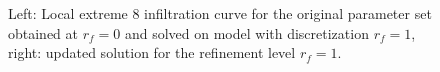 \documentclass[review,times,3p,10pt]{elsarticle}
\begin{document}
\begin{figure}
\label{rf0rf1img2}
\caption{Left: Local extreme 8 infiltration curve for the original parameter set obtained at $r_f=0$ and solved on model with discretization $r_f=1$, right: updated solution for the refinement level $r_f=1$.}
\end{figure}
\end{document}
